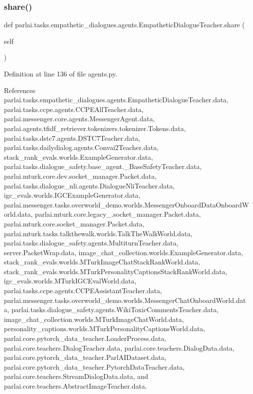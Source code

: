 \subsubsection{\texorpdfstring{share()}{share()}}
{\footnotesize\ttfamily def parlai.\+tasks.\+empathetic\+\_\+dialogues.\+agents.\+Empathetic\+Dialogue\+Teacher.\+share (\begin{DoxyParamCaption}\item[{}]{self }\end{DoxyParamCaption})}



Definition at line 136 of file agents.\+py.



References parlai.\+tasks.\+empathetic\+\_\+dialogues.\+agents.\+Empathetic\+Dialogue\+Teacher.\+data, parlai.\+tasks.\+ccpe.\+agents.\+C\+C\+P\+E\+All\+Teacher.\+data, parlai.\+messenger.\+core.\+agents.\+Messenger\+Agent.\+data, parlai.\+agents.\+tfidf\+\_\+retriever.\+tokenizers.\+tokenizer.\+Tokens.\+data, parlai.\+tasks.\+dstc7.\+agents.\+D\+S\+T\+C7\+Teacher.\+data, parlai.\+tasks.\+dailydialog.\+agents.\+Convai2\+Teacher.\+data, stack\+\_\+rank\+\_\+evals.\+worlds.\+Example\+Generator.\+data, parlai.\+tasks.\+dialogue\+\_\+safety.\+base\+\_\+agent.\+\_\+\+Base\+Safety\+Teacher.\+data, parlai.\+mturk.\+core.\+dev.\+socket\+\_\+manager.\+Packet.\+data, parlai.\+tasks.\+dialogue\+\_\+nli.\+agents.\+Dialogue\+Nli\+Teacher.\+data, igc\+\_\+evals.\+worlds.\+I\+G\+C\+Example\+Generator.\+data, parlai.\+messenger.\+tasks.\+overworld\+\_\+demo.\+worlds.\+Messenger\+Onboard\+Data\+Onboard\+World.\+data, parlai.\+mturk.\+core.\+legacy\+\_.\+socket\+\_\+manager.\+Packet.\+data, parlai.\+mturk.\+core.\+socket\+\_\+manager.\+Packet.\+data, parlai.\+mturk.\+tasks.\+talkthewalk.\+worlds.\+Talk\+The\+Walk\+World.\+data, parlai.\+tasks.\+dialogue\+\_\+safety.\+agents.\+Multiturn\+Teacher.\+data, server.\+Packet\+Wrap.\+data, image\+\_\+chat\+\_\+collection.\+worlds.\+Example\+Generator.\+data, stack\+\_\+rank\+\_\+evals.\+worlds.\+M\+Turk\+Image\+Chat\+Stack\+Rank\+World.\+data, stack\+\_\+rank\+\_\+evals.\+worlds.\+M\+Turk\+Personality\+Captions\+Stack\+Rank\+World.\+data, igc\+\_\+evals.\+worlds.\+M\+Turk\+I\+G\+C\+Eval\+World.\+data, parlai.\+tasks.\+ccpe.\+agents.\+C\+C\+P\+E\+Assistant\+Teacher.\+data, parlai.\+messenger.\+tasks.\+overworld\+\_\+demo.\+worlds.\+Messenger\+Chat\+Onboard\+World.\+data, parlai.\+tasks.\+dialogue\+\_\+safety.\+agents.\+Wiki\+Toxic\+Comments\+Teacher.\+data, image\+\_\+chat\+\_\+collection.\+worlds.\+M\+Turk\+Image\+Chat\+World.\+data, personality\+\_\+captions.\+worlds.\+M\+Turk\+Personality\+Captions\+World.\+data, parlai.\+core.\+pytorch\+\_\+data\+\_\+teacher.\+Loader\+Process.\+data, parlai.\+core.\+teachers.\+Dialog\+Teacher.\+data, parlai.\+core.\+teachers.\+Dialog\+Data.\+data, parlai.\+core.\+pytorch\+\_\+data\+\_\+teacher.\+Parl\+A\+I\+Dataset.\+data, parlai.\+core.\+pytorch\+\_\+data\+\_\+teacher.\+Pytorch\+Data\+Teacher.\+data, parlai.\+core.\+teachers.\+Stream\+Dialog\+Data.\+data, and parlai.\+core.\+teachers.\+Abstract\+Image\+Teacher.\+data.



